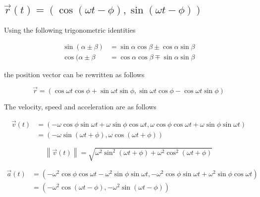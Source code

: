 \documentclass[letterpaper,12pt]{article}
\begin{document}

\subsection{$\vec{r}(t) = ( \cos (\omega t - \phi), \sin (\omega t - \phi))$}

Using the following trigonometric identities

\begin{equation*}
 \begin{split}
  \sin (\alpha \pm \beta) & = \sin \alpha \cos \beta \pm \cos \alpha \sin \beta 
\\
\cos (\alpha \pm \beta & = \cos \alpha \cos \beta \mp \sin \alpha \sin \beta
 \end{split}
\end{equation*}

the position vector can be rewritten as follows

\begin{equation*}
 \vec{r} = (
 \cos \omega t \cos \phi + \sin \omega t \sin \phi,
 \sin \omega t \cos \phi - \cos \omega t \sin \phi
 )
\end{equation*}

The velocity, speed and acceleration are as follows

 \begin{equation*}
 \begin{split}
 \vec{v}(t) & = ( - \omega \cos \phi \sin \omega t + \omega \sin \phi \cos 
\omega t, \omega \cos \phi \cos \omega t + \omega \sin \phi \sin \omega t) \\
& = (- \omega \sin (\omega t + \phi), \omega \cos (\omega t + \phi))
 \end{split}
 \end{equation*}


\begin{equation*}
 \left \| \vec{v}(t) \right \| = \sqrt{ \omega ^2 \sin ^2 (\omega t + \phi) + 
\omega ^ 2 \cos ^2 (\omega t + \phi)}
\end{equation*}

 \begin{equation*}
 \begin{split}
  \vec{a}(t) & =  ( - \omega ^2 \cos \phi \cos \omega t - \omega ^2 \sin \phi 
\sin \omega t, - \omega ^2 \cos \phi \sin \omega t + \omega ^2 \sin \phi \cos 
\omega t)\\
& = ( - \omega ^2 \cos (\omega t - \phi), -\omega ^ 2 \sin (\omega t - \phi))
 \end{split}
 \end{equation*}
 
\end{document}
